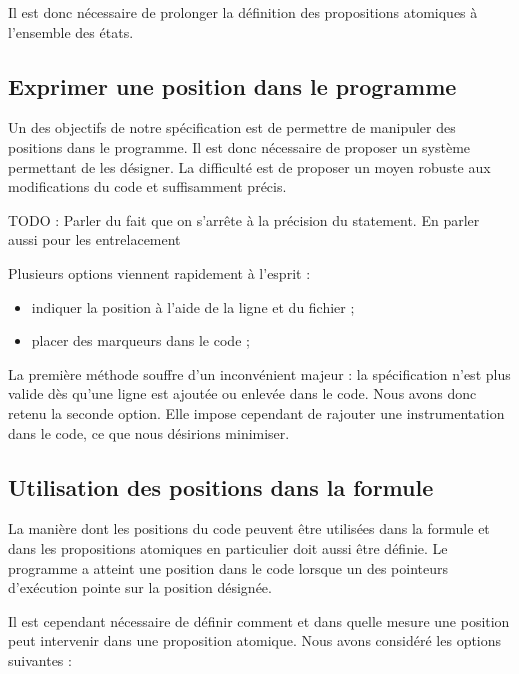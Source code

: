 Il est donc nécessaire de prolonger la définition des propositions
atomiques à l'ensemble des états.

\subsection{Exprimer une position dans le programme}

Un des objectifs de notre spécification est de permettre de manipuler
des positions dans le programme. Il est donc nécessaire de proposer un
système permettant de les désigner. La difficulté est de proposer un
moyen robuste aux modifications du code et suffisamment précis.

TODO : Parler du fait que on s'arrête à la précision du statement. En
parler aussi pour les entrelacement

Plusieurs options viennent rapidement à l'esprit :

\begin{itemize}
\item
  indiquer la position à l'aide de la ligne et du fichier ;
\item
  placer des marqueurs dans le code ;
\end{itemize}

La première méthode souffre d'un inconvénient majeur : la spécification
n'est plus valide dès qu'une ligne est ajoutée ou enlevée dans le code.
Nous avons donc retenu la seconde option. Elle impose cependant de
rajouter une instrumentation dans le code, ce que nous désirions
minimiser.

\subsection{Utilisation des positions dans la formule}

La manière dont les positions du code peuvent être utilisées dans la
formule et dans les propositions atomiques en particulier doit aussi
être définie. Le programme a atteint une position dans le code lorsque
un des pointeurs d'exécution pointe sur la position désignée.

Il est cependant nécessaire de définir comment et dans quelle mesure une
position peut intervenir dans une proposition atomique. Nous avons
considéré les options suivantes :

